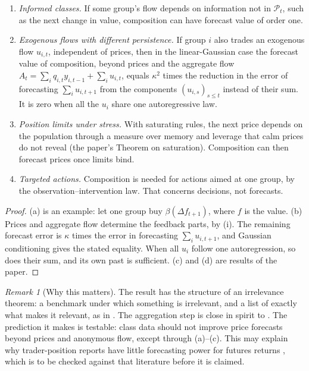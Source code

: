 \documentclass[11pt]{article}
\theoremstyle{remark}\newtheorem{remark}[theorem]{Remark}
\begin{document}
\begin{proposition}\label{prop:exc}
\begin{enumerate}[label=(\alph*),itemsep=2pt]
\item \emph{Informed classes.} If some group's flow depends on information not in $\mathcal P_t$, such as the next change in value, composition can have forecast value of order one.
\item \emph{Exogenous flows with different persistence.} If group $i$ also trades an exogenous flow $u_{i,t}$, independent of prices, then in the linear-Gaussian case the forecast value of composition, beyond prices and the aggregate flow $A_t=\sum_iq_{i,t}y_{i,t-1}+\sum_iu_{i,t}$, equals $\kappa^2$ times the reduction in the error of forecasting $\sum_iu_{i,t+1}$ from the components $(u_{i,s})_{s\le t}$ instead of their sum. It is zero when all the $u_i$ share one autoregressive law.
\item \emph{Position limits under stress.} With saturating rules, the next price depends on the population through a measure over memory and leverage that calm prices do not reveal (the paper's Theorem on saturation). Composition can then forecast prices once limits bind.
\item \emph{Targeted actions.} Composition is needed for actions aimed at one group, by the observation--intervention law. That concerns decisions, not forecasts.
\end{enumerate}
\end{proposition}
\begin{proof}
(a) is an example: let one group buy $\beta(\Delta f_{t+1})$, where $f$ is the value. (b) Prices and aggregate flow determine the feedback parts, by (i). The remaining forecast error is $\kappa$ times the error in forecasting $\sum_iu_{i,t+1}$, and Gaussian conditioning gives the stated equality. When all $u_i$ follow one autoregression, so does their sum, and its own past is sufficient. (c) and (d) are results of the paper.
\end{proof}

\begin{remark}[Why this matters]
The result has the structure of an irrelevance theorem: a benchmark under which something is irrelevant, and a list of exactly what makes it relevant, as in \citet{mm1958}. The aggregation step is close in spirit to \citet{gorman1953}. The prediction it makes is testable: class data should not improve price forecasts beyond prices and anonymous flow, except through (a)--(c). This may explain why trader-position reports have little forecasting power for futures returns \citep{sandersetal2009}, which is to be checked against that literature before it is claimed.
\end{remark}
\end{document}
